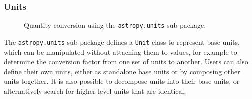 \documentclass[traditabstract]{aa}
\begin{document}
\subsubsection{Units}

\begin{figure}
\center
\caption{Quantity conversion using the \texttt{astropy.units} sub-package.\label{code:quantities}}
\vspace{0.1in}
\end{figure}
\label{sec:units}

The \texttt{astropy.units} sub-package defines a \texttt{Unit} class to
represent base units, which can be manipulated without attaching them to
values, for example to determine the conversion factor from one set of units to
another. Users can also define their own units, either as standalone base units
or by composing other units together. It is also possible to decompose units
into their base units, or alternatively search for higher-level units that are
identical.
\end{document}

